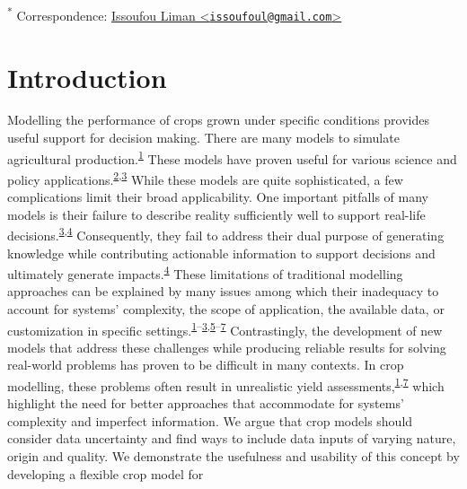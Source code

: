 \documentclass[11pt,preprint]{article}
\begin{document}
\textsuperscript{*} Correspondence:
\href{mailto:issoufoul@gmail.com}{Issoufou Liman
\textless{}\href{mailto:issoufoul@gmail.com}{\nolinkurl{issoufoul@gmail.com}}\textgreater{}}

\hypertarget{introduction}{%
\section{Introduction}\label{introduction}}

Modelling the performance of crops grown under specific conditions
provides useful support for decision making. There are many models to
simulate agricultural
production.\textsuperscript{\protect\hyperlink{ref-Murthy_2004}{1}}
These models have proven useful for various science and policy
applications.\textsuperscript{\protect\hyperlink{ref-Boote_et_al_1996}{2},\protect\hyperlink{ref-Cerdan_et_al_2002}{3}}
While these models are quite sophisticated, a few complications limit
their broad applicability. One important pitfalls of many models is
their failure to describe reality sufficiently well to support real-life
decisions.\textsuperscript{\protect\hyperlink{ref-Cerdan_et_al_2002}{3},\protect\hyperlink{ref-Luedeling_et_al_2017}{4}}
Consequently, they fail to address their dual purpose of generating
knowledge while contributing actionable information to support decisions
and ultimately generate
impacts.\textsuperscript{\protect\hyperlink{ref-Luedeling_et_al_2017}{4}}
These limitations of traditional modelling approaches can be explained
by many issues among which their inadequacy to account for systems'
complexity, the scope of application, the available data, or
customization in specific
settings.\textsuperscript{\protect\hyperlink{ref-Murthy_2004}{1}--\protect\hyperlink{ref-Cerdan_et_al_2002}{3},\protect\hyperlink{ref-Luedeling_and_Shepherd_2016}{5}--\protect\hyperlink{ref-VanIttersum_et_al_2013}{7}}
Contrastingly, the development of new models that address these
challenges while producing reliable results for solving real-world
problems has proven to be difficult in many contexts. In crop modelling,
these problems often result in unrealistic yield
assessments,\textsuperscript{\protect\hyperlink{ref-Murthy_2004}{1},\protect\hyperlink{ref-VanIttersum_et_al_2013}{7}}
which highlight the need for better approaches that accommodate for
systems' complexity and imperfect information. We argue that crop models
should consider data uncertainty and find ways to include data inputs of
varying nature, origin and quality. We demonstrate the usefulness and
usability of this concept by developing a flexible crop model for
\end{document}
